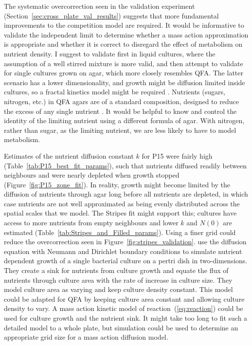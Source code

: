 The systematic overcorrection seen in the validation experiment
(Section~\ref{sec:cross_plate_val_results}) suggests that more
fundamental improvements to the competition model are required. It
would be informative to validate the independent limit to determine
whether a mass action approximation is appropriate and whether it is
correct to disregard the effect of metabolism on nutrient density. I
suggest to validate first in liquid cultures, where the assumption of
a well stirred mixture is more valid, and then attempt to validate for
single cultures grown on agar, which more closely resembles QFA. The
latter scenario has a lower dimensionality, and growth might be
diffusion limited inside cultures, so a fractal kinetics model might
be required \citep{Kopelman1988,savageau1995}. Nutrients (sugars,
nitrogen, etc.)  in QFA agars are of a standard composition, designed
to reduce the excess of any single nutrient \citep{Addinall2011}. It
would be helpful to know and control the identity of the limiting
nutrient using a different formula of agar. With nitrogen, rather than
sugar, as the limiting nutrient, we are less likely to have to model
metabolism.

Estimates of the nutrient diffusion constant \(k\) for P15 were fairly
high (Table~\ref{tab:P15_best_fit_params}), such that nutrients
diffused readily between neighbours and were nearly depleted when
growth stopped (Figure~\ref{fig:P15_zone_fit}). In reality, growth
might become limited by the diffusion of nutrients through agar long
before all nutrients are depleted, in which case nutrients are not
well approximated as being evenly distributed across the spatial
scales that we model. The Stripes fit might support this; cultures
have access to more nutrients from empty neighbours and lower \(k\)
and \(N(0)\) are estimated
(Table~\ref{tab:Stripes_and_Filled_params}). Using a finer grid could
reduce the overcorrection seen in
Figure~\ref{fig:stripes_validation}.
\citet{Reo2014} use the diffusion equation with Neumann and Dirichlet
boundary conditions to simulate nutrient dependent growth of a single
bacterial culture on a pertri dish in two-dimensions. They create a
sink for nutrients from culture growth and equate the flux of
nutrients through culture area with the rate of increase in culture
size. They model culture area as varying and keep culture density
constant. This model could be adapted for QFA by keeping culture area
constant and allowing culture density to vary. A mass action kinetic
model of reaction~(\ref{eq:reaction}) could be used for culture growth
and the nutrient sink. It might take too long to fit such a detailed
model to a whole plate, but simulation could be used to determine an
appropriate grid size for a mass action diffusion model.

